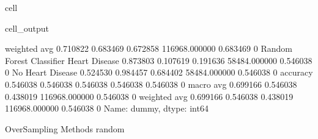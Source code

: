 \documentclass[letterpaper,10pt,english]{jupyterBook}
\begin{document}
\begin{sphinxuseclass}{cell}
\begin{sphinxVerbatimOutput}
\begin{sphinxuseclass}{cell_output}
\begin{sphinxVerbatim}[commandchars=\\\{\}]
                           weighted avg      0.710822   0.683469  0.672858  116968.000000  0.683469    0
Random Forest Classifier   Heart Disease     0.873803   0.107619  0.191636  58484.000000   0.546038    0
                           No Heart Disease  0.524530   0.984457  0.684402  58484.000000   0.546038    0
                           accuracy          0.546038   0.546038  0.546038  0.546038       0.546038    0
                           macro avg         0.699166   0.546038  0.438019  116968.000000  0.546038    0
                           weighted avg      0.699166   0.546038  0.438019  116968.000000  0.546038    0
Name: dummy, dtype: int64

OverSampling Methods
\PYGZhy{}\PYGZhy{}\PYGZhy{}\PYGZhy{}\PYGZhy{}\PYGZhy{}\PYGZhy{}\PYGZhy{}\PYGZhy{}\PYGZhy{}\PYGZhy{}\PYGZhy{}\PYGZhy{}\PYGZhy{}\PYGZhy{}\PYGZhy{}\PYGZhy{}\PYGZhy{}\PYGZhy{}
random
\PYGZhy{}\PYGZhy{}\PYGZhy{}\PYGZhy{}\PYGZhy{}\PYGZhy{}\PYGZhy{}\PYGZhy{}\PYGZhy{}\PYGZhy{}\PYGZhy{}\PYGZhy{}\PYGZhy{}\PYGZhy{}\PYGZhy{}\PYGZhy{}\PYGZhy{}\PYGZhy{}\PYGZhy{}
\end{sphinxVerbatim}

\noindent{}


\end{sphinxuseclass}
\end{sphinxVerbatimOutput}
\end{sphinxuseclass}
\end{document}

